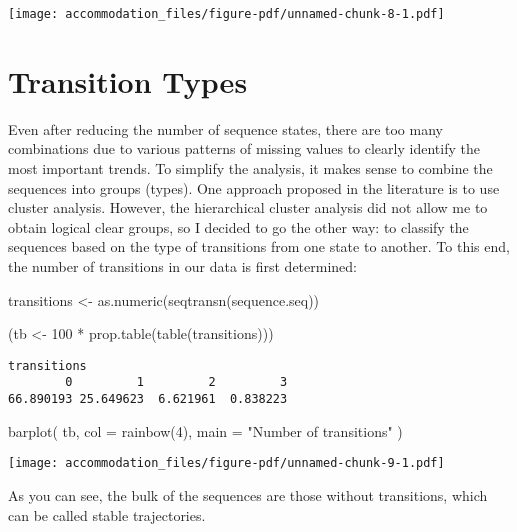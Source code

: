 \documentclass[
  letterpaper,
  DIV=11,
  numbers=noendperiod]{scrreprt}
\newenvironment{Shaded}{\begin{snugshade}}{\end{snugshade}}
\newcommand{\AttributeTok}[1]{\textcolor[rgb]{0.40,0.45,0.13}{#1}}
\newcommand{\DecValTok}[1]{\textcolor[rgb]{0.68,0.00,0.00}{#1}}
\newcommand{\FunctionTok}[1]{\textcolor[rgb]{0.28,0.35,0.67}{#1}}
\newcommand{\NormalTok}[1]{\textcolor[rgb]{0.00,0.23,0.31}{#1}}
\newcommand{\OtherTok}[1]{\textcolor[rgb]{0.00,0.23,0.31}{#1}}
\newcommand{\SpecialCharTok}[1]{\textcolor[rgb]{0.37,0.37,0.37}{#1}}
\newcommand{\StringTok}[1]{\textcolor[rgb]{0.13,0.47,0.30}{#1}}
\begin{document}
\texttt{[image: accommodation\_files/figure-pdf/unnamed-chunk-8-1.pdf]}

\section{Transition Types}\label{transition-types}

Even after reducing the number of sequence states, there are too many
combinations due to various patterns of missing values to clearly
identify the most important trends. To simplify the analysis, it makes
sense to combine the sequences into groups (types). One approach
proposed in the literature is to use cluster analysis. However, the
hierarchical cluster analysis did not allow me to obtain logical clear
groups, so I decided to go the other way: to classify the sequences
based on the type of transitions from one state to another. To this end,
the number of transitions in our data is first determined:

\begin{Shaded}
\begin{Highlighting}[]
\NormalTok{transitions }\OtherTok{\textless{}{-}} \FunctionTok{as.numeric}\NormalTok{(}\FunctionTok{seqtransn}\NormalTok{(sequence.seq))}

\NormalTok{(tb }\OtherTok{\textless{}{-}} \DecValTok{100} \SpecialCharTok{*} \FunctionTok{prop.table}\NormalTok{(}\FunctionTok{table}\NormalTok{(transitions)))}
\end{Highlighting}
\end{Shaded}

\begin{verbatim}
transitions
        0         1         2         3 
66.890193 25.649623  6.621961  0.838223 
\end{verbatim}

\begin{Shaded}
\begin{Highlighting}[]
\FunctionTok{barplot}\NormalTok{(}
\NormalTok{  tb, }\AttributeTok{col =} \FunctionTok{rainbow}\NormalTok{(}\DecValTok{4}\NormalTok{),}
  \AttributeTok{main =} \StringTok{"Number of transitions"}
\NormalTok{)}
\end{Highlighting}
\end{Shaded}

\texttt{[image: accommodation\_files/figure-pdf/unnamed-chunk-9-1.pdf]}

As you can see, the bulk of the sequences are those without transitions,
which can be called stable trajectories.
\end{document}
